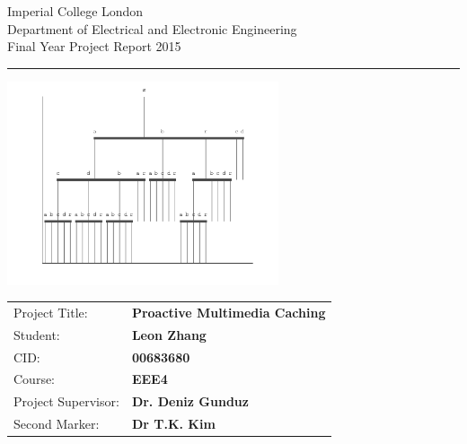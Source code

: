 
\begin{titlepage}
                \setlength{\parindent}{0pt}
                \setlength{\parskip}{0pt}

                {
                                \Large
                                \raggedright
                                Imperial College London\\[17pt]
                                Department of Electrical and Electronic Engineering\\[17pt]
                                Final Year Project Report 2015\\[17pt]
 
                }

                \rule{\columnwidth}{3pt}
                \vfill
                \centering
                  \includegraphics[width=0.7\columnwidth,height=60mm,keepaspectratio]{background/cover.png}
                \vfillba
                \setlength{\tabcolsep}{0pt}

                \begin{tabular}{p{40mm}p{\dimexpr\columnwidth-40mm}}
                                Project Title: & \textbf{Proactive Multimedia Caching} \\[12pt]
                                Student: & \textbf{Leon Zhang} \\[12pt]
                                CID: & \textbf{00683680} \\[12pt]
                                Course: & \textbf{EEE4} \\[12pt]
                                Project Supervisor: & \textbf{Dr. Deniz Gunduz} \\[12pt]
                                Second Marker: & \textbf{Dr T.K. Kim} \\
                \end{tabular}


\end{titlepage}
